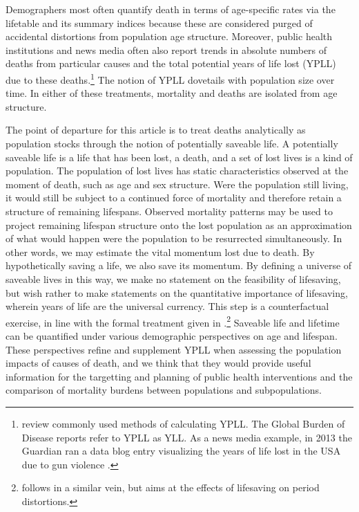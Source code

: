 \documentclass{article}
\begin{document}
Demographers most often quantify death in terms of age-specific rates via the
lifetable and its summary indices because these are considered purged of
accidental distortions from population age structure. Moreover, public health
institutions and news media often also report trends in absolute numbers of
deaths from particular causes and the total potential years of life lost (YPLL) due to these deaths.\footnote{\citet{gardner1990} review commonly used methods of
calculating YPLL. The Global Burden of Disease reports refer to YPLL as YLL.
As a news media example, in 2013 the Guardian ran a data blog entry
visualizing the years of life lost in the USA due to gun violence
\citep{rogers2013gun}. } The notion of YPLL dovetails with
population size over time. In either of these treatments, mortality and deaths are
isolated from age structure. 

The point of departure for this article is to
treat deaths analytically as population stocks through the notion of
potentially saveable life. A potentially saveable life is a life that
has been lost, a death, and a set of lost lives is a kind of population. The
population of lost lives has static characteristics observed at the moment of
death, such as age and sex structure. Were the
population still living, it would still be subject to a continued force of
mortality and therefore retain a structure of remaining lifespans.
Observed mortality patterns may be used to project remaining lifespan structure onto the lost population as an approximation of what would
happen were the population to be resurrected simultaneously. In other words, we
may estimate the vital momentum lost due to death. By hypothetically saving a
life, we also save its momentum. By defining a universe of saveable lives in
this way, we make no statement on the feasibility of lifesaving, but wish
rather to make statements on the quantitative importance of lifesaving, wherein
years of life are the universal currency.
This step is a counterfactual exercise, in line with the formal treatment given in \citet{vaupel1987repeated}.\footnote{\citet{vaupel2008lifesaving} follows in a similar vein, but aims at the effects of lifesaving on period distortions.} Saveable life and lifetime can be quantified under various demographic perspectives on age and lifespan. These perspectives refine and supplement YPLL when assessing the population impacts of causes of death, and we think that they would provide useful information for the targetting and planning of public health interventions and the comparison of mortality burdens between populations and subpopulations.
\end{document}
